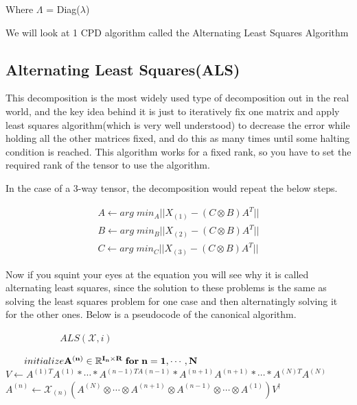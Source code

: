 \documentclass[11pt]{article}
\newcommand\0{\mathbf{0}}
\newcommand\RR{\mathbb{R}}
\newcommand\<{\langle}
\renewcommand\>{\rangle}
\begin{document}
Where $\Lambda$ = Diag($\lambda$)

We will look at 1 CPD algorithm called the Alternating Least Squares Algorithm

\subsection{Alternating Least Squares(ALS)}

This decomposition is the most widely used type of decomposition out in the real world, and the key
idea behind it is just to iteratively fix one matrix and apply least squares algorithm(which is very well understood) to decrease the error while holding all the other matrices fixed, and do this as many times until some halting condition is reached. This algorithm works for a fixed rank, so 
you have to set the required rank of the tensor to use the algorithm.

In the case of a 3-way tensor, the decomposition would repeat the below steps.

\begin{align*}
    A\leftarrow arg\;min_{A} || X_{(1)}- (C \otimes B) A^{T}||\\
    B\leftarrow arg\;min_{B} || X_{(2)}- (C \otimes B) A^{T}||\\
    C\leftarrow arg\;min_{C} || X_{(3)}- (C \otimes B) A^{T}||
\end{align*}

Now if you squint your eyes at the equation you will see why it is called alternating least squares, since the solution to these problems is the same as solving the least squares problem for one case and then alternatingly solving it for the other ones. Below is a pseudocode of the canonical algorithm.

\begin{algorithm}
\begin{algorithmic}
        \State $ALS(\mathcal{X},i)$
    \EndFor
    
\Else
    \State $initialize \bf A^{(n)} \in \RR^{I_{n}\times R}\;for\;n=1,\cdots, N$
         \State $V \gets A^{(1)T}A^{(1)}*\cdots* A^{(n-1)TA^{}(n-1)}*A^{(n+1)}A^{(n+1)}*\cdots*A^{(N)T}A^{(N)}$
         \State $A^{(n)}\gets \mathcal{X}_{(n)}(A^{(N)}\otimes \cdots \otimes A^{(n+1)} \otimes A^{(n-1)}\otimes \cdots \otimes A^{(1)})V^{\dagger}$
    \EndFor
    \EndWhile
\EndIf
\EndProcedure
\end{algorithmic}
\end{algorithm}
\end{document}
